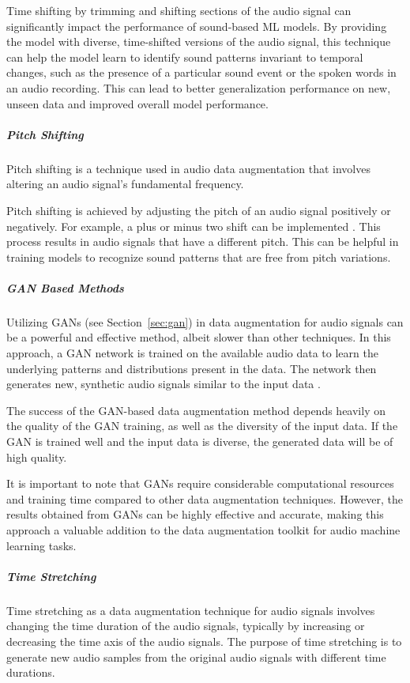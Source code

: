 Time shifting by trimming and shifting sections of the audio signal can significantly impact the performance of sound-based \ac{ML} models. By providing the model with diverse, time-shifted versions of the audio signal, this technique can help the model learn to identify sound patterns invariant to temporal changes, such as the presence of a particular sound event or the spoken words in an audio recording. This can lead to better generalization performance on new, unseen data and improved overall model performance.

\subparagraph{Pitch Shifting}
Pitch shifting is a technique used in audio data augmentation that involves altering an audio signal's fundamental frequency.

Pitch shifting is achieved by adjusting the pitch of an audio signal positively or negatively. For example, a plus or minus two shift can be implemented \cite{mushtaq_environmental_2020}. This process results in audio signals that have a different pitch. This can be helpful in training models to recognize sound patterns that are free from pitch variations.

\subparagraph{GAN Based Methods}
Utilizing \acp{GAN} (see Section~\ref{sec:gan}) in data augmentation for audio signals can be a powerful and effective method, albeit slower than other techniques. In this approach, a \ac{GAN} network is trained on the available audio data to learn the underlying patterns and distributions present in the data. The network then generates new, synthetic audio signals similar to the input data \cite{qian_data_2019}.

The success of the \ac{GAN}-based data augmentation method depends heavily on the quality of the \ac{GAN} training, as well as the diversity of the input data. If the \ac{GAN} is trained well and the input data is diverse, the generated data will be of high quality.

It is important to note that \acp{GAN} require considerable computational resources and training time compared to other data augmentation techniques. However, the results obtained from \acp{GAN} can be highly effective and accurate, making this approach a valuable addition to the data augmentation toolkit for audio machine learning tasks.

\subparagraph{Time Stretching}
Time stretching as a data augmentation technique for audio signals involves changing the time duration of the audio signals, typically by increasing or decreasing the time axis of the audio signals. The purpose of time stretching is to generate new audio samples from the original audio signals with different time durations.


